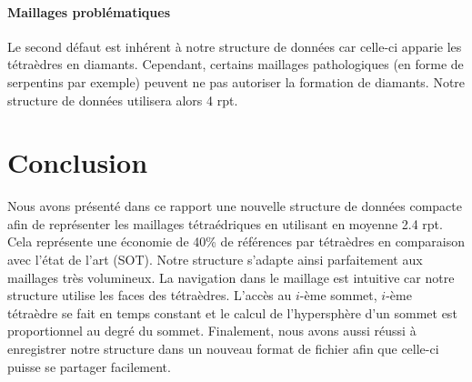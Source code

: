 \paragraph{Maillages problématiques}Le second défaut est inhérent à notre structure de données car celle-ci apparie les tétraèdres en diamants. Cependant, certains maillages pathologiques (en forme de serpentins par exemple) peuvent ne pas autoriser la formation de diamants. Notre structure de données utilisera alors 4 rpt.

\section{Conclusion}
\noindent
Nous avons présenté dans ce rapport une nouvelle structure de données compacte afin de représenter les maillages tétraédriques en utilisant en moyenne 2.4 rpt. Cela représente une économie de 40\% de références par tétraèdres en comparaison avec l'état de l'art (SOT). Notre structure s'adapte ainsi parfaitement aux maillages très volumineux. La navigation dans le maillage est intuitive car notre structure utilise les faces des tétraèdres. L'accès au $i$-ème sommet, $i$-ème tétraèdre se fait en temps constant et le calcul de l'hypersphère d'un sommet est proportionnel au degré du sommet. Finalement, nous avons aussi réussi à enregistrer notre structure dans un nouveau format de fichier afin que celle-ci puisse se partager facilement.